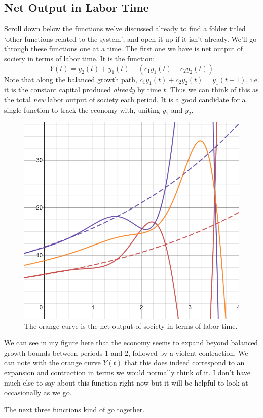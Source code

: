 \documentclass{article}
\theoremstyle{theorem}
\begin{document}
\subsection{Net Output in Labor Time}
Scroll down below the functions we've discussed already to find a folder titled `other functions related to the system', and open it up if it isn't already. We'll go through these functions one at a time. The first one we have is net output of society in terms of labor time. It is the function:
\[ Y(t) = y_2(t)+y_1(t)-(c_1y_1(t)+c_2y_2(t)) \]
Note that along the balanced growth path, $c_1y_1(t) + c_2y_2(t) = y_1(t-1)$, i.e. it is the constant capital produced \emph{already} by time $t$. Thus we can think of this as the total \emph{new} labor output of society each period. It is a good candidate for a single function to track the economy with, uniting $y_1$ and $y_2$.
\begin{figure}[H]
\centering
\includegraphics[scale=.7]{Images/netOutput}
\caption{The orange curve is the net output of society in terms of labor time.}
\end{figure}
 We can see in my figure here that the economy seems to expand beyond balanced growth bounds between periods $1$ and $2$, followed by a violent contraction. We can note with the orange curve $Y(t)$ that this does indeed correspond to an expansion and contraction in terms we would normally think of it. I don't have much else to say about this function right now but it will be helpful to look at occasionally as we go. \par 
The next three functions kind of go together.
\end{document}
